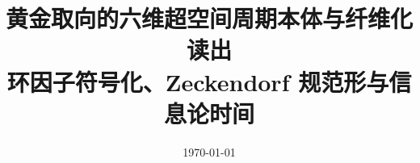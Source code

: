 \documentclass[11pt,letterpaper]{ctexart}
\title{黄金取向的六维超空间周期本体与纤维化读出\\\large 环因子符号化、Zeckendorf 规范形与信息论时间}
\author{}
\date{\today}
\begin{document}
\maketitle



















\FloatBarrier
\appendix









\FloatBarrier

\end{document}
